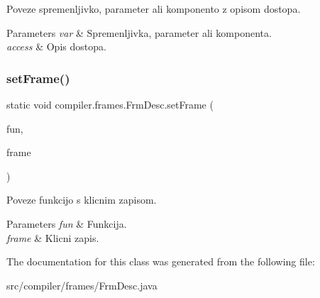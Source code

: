 Poveze spremenljivko, parameter ali komponento z opisom dostopa.


\begin{DoxyParams}{Parameters}
{\em var} & Spremenljivka, parameter ali komponenta. \\
\hline
{\em access} & Opis dostopa. \\
\hline
\end{DoxyParams}
\mbox{\label{classcompiler_1_1frames_1_1_frm_desc_a28716d1f65fe0570d4bd8f10bc5368e7}} 
\subsubsection{\texorpdfstring{set\+Frame()}{setFrame()}}
{\footnotesize\ttfamily static void compiler.\+frames.\+Frm\+Desc.\+set\+Frame (\begin{DoxyParamCaption}\item[{\hyperlink{classcompiler_1_1abstr_1_1tree_1_1def_1_1_abs_def}{Abs\+Def}}]{fun,  }\item[{\hyperlink{classcompiler_1_1frames_1_1_frm_frame}{Frm\+Frame}}]{frame }\end{DoxyParamCaption})\hspace{0.3cm}{\ttfamily [static]}}

Poveze funkcijo s klicnim zapisom.


\begin{DoxyParams}{Parameters}
{\em fun} & Funkcija. \\
\hline
{\em frame} & Klicni zapis. \\
\hline
\end{DoxyParams}


The documentation for this class was generated from the following file\+:\begin{DoxyCompactItemize}
\item 
src/compiler/frames/Frm\+Desc.\+java\end{DoxyCompactItemize}
